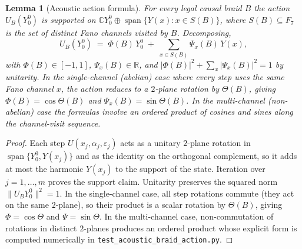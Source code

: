 \documentclass[11pt,a4paper]{article}
\theoremstyle{plain}
\newtheorem{lemma}[theorem]{Lemma}
\theoremstyle{definition}
\theoremstyle{remark}
\numberwithin{equation}{section}
\newcommand{\Complex}{\mathbb{C}}
\newcommand{\R}{\mathbb{R}}
\DeclareMathOperator{\spn}{span}
\begin{document}
\begin{lemma}[Acoustic action formula]
\label{lem:acoustic-action-formula}
For every legal causal braid $B$ the action $U_B(Y_0^0)$ is supported
on $\Complex Y_0^0\oplus\spn\{Y(x):x\in S(B)\}$, where
$S(B)\subseteq F_7$ is the set of distinct Fano channels visited by
$B$.  Decomposing,
\[
  U_B(Y_0^0)
  \;=\;\Phi(B)\,Y_0^0
        \;+\;\sum_{x\in S(B)}\Psi_x(B)\,Y(x),
\]
with $\Phi(B)\in[-1,1]$, $\Psi_x(B)\in\R$, and
$|\Phi(B)|^2+\sum_x|\Psi_x(B)|^2=1$ by unitarity.  In the
\emph{single-channel} (abelian) case where every step uses the
same Fano channel $x$, the action reduces to a $2$-plane rotation
by $\Theta(B)$, giving $\Phi(B)=\cos\Theta(B)$ and
$\Psi_x(B)=\sin\Theta(B)$.  In the \emph{multi-channel}
(non-abelian) case the formulas involve an ordered product of
cosines and sines along the channel-visit sequence.
\end{lemma}

\begin{proof}
Each step $U(x_j,\alpha_j,\varepsilon_j)$ acts as a unitary
$2$-plane rotation in $\spn\{Y_0^0,Y(x_j)\}$ and as the identity on
the orthogonal complement, so it adds at most the harmonic
$Y(x_j)$ to the support of the state.  Iteration over
$j=1,\dots,m$ proves the support claim.  Unitarity preserves the
squared norm $\|U_B Y_0^0\|^2=1$.  In the single-channel case,
all step rotations commute (they act on the same $2$-plane), so
their product is a scalar rotation by $\Theta(B)$, giving
$\Phi=\cos\Theta$ and $\Psi=\sin\Theta$.  In the multi-channel
case, non-commutation of rotations in distinct $2$-planes
produces an ordered product whose explicit form is computed
numerically in \texttt{test\_acoustic\_braid\_action.py}.
\end{proof}
\end{document}
